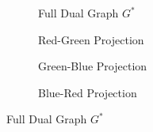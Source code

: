 \documentclass{article}
\begin{document}
\begin{figure}[ht]
    \centering
    \begin{subfigure}{0.2375\textwidth}
        \centering
        \resizebox{\textwidth}{!}{}
        \caption{Full Dual Graph $G^*$}
    \end{subfigure}
    \hfill
    \begin{subfigure}{0.2375\textwidth}
        \centering
        \resizebox{\textwidth}{!}{}
        \caption{Red-Green Projection}
    \end{subfigure}
    \hfill
    \begin{subfigure}{0.2375\textwidth}
        \centering
        \resizebox{\textwidth}{!}{}
        \caption{Green-Blue Projection}
    \end{subfigure}
    \vspace{0.5cm}
    \begin{subfigure}{0.2375\textwidth}
        \centering
        \resizebox{\textwidth}{!}{}
        \caption{Blue-Red Projection}
    \end{subfigure}
    
    \vspace{0.5cm}
    \caption{Full Dual Graph $G^*$}
\end{figure}
\end{document}
